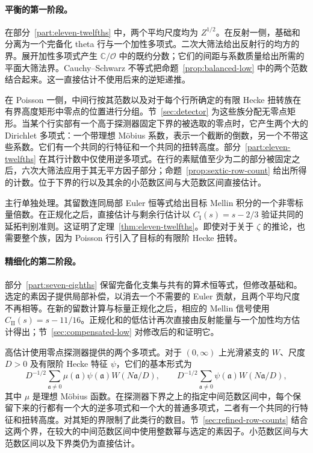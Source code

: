 \documentclass[11pt,a4paper]{article}
\numberwithin{equation}{section}
\numberwithin{figure}{section}
\theoremstyle{definition}
\theoremstyle{remark}
\begin{document}
\paragraph{平衡的第一阶段。}
在部分~\ref{part:eleven-twelfths} 中，两个平均尺度均为 $Z^{1/2}$。在反射一侧，基础和分离为一个完备化 theta 行与一个加性多项式。二次大筛法给出反射行的均方的界。展开加性多项式产生 $\mathbb C/\mathcal O$ 中的既约分数；它们的间距与系数质量给出所需的平面大筛法界。Cauchy--Schwarz 不等式把命题~\ref{prop:balanced-low} 中的两个范数结合起来。这一直接估计不使用后来的逆矩递推。

在 Poisson 一侧，中间行按其范数以及对于每个行所确定的有限 Hecke 扭转族在有界高度矩形中零点的位置进行分组。节~\ref{sec:detector} 为这些族分配无零点矩形。当某个行实部有一个高于探测器固定下界的被选取的零点时，它产生两个大的 Dirichlet 多项式：一个带理想 M\"obius 系数，表示一个截断的倒数，另一个不带这些系数。它们有一个共同的行特征和一个共同的扭转高度。部分~\ref{part:eleven-twelfths} 在其行计数中仅使用逆多项式。在行的素赋值至少为二的部分被固定之后，六次大筛法应用于其无平方因子部分；命题~\ref{prop:sextic-row-count} 给出所得的计数。位于下界的行以及其余的小范数区间与大范数区间直接估计。

主行单独处理。其留数连同局部 Euler 恒等式给出目标 Mellin 积分的一个非零标量倍数。在正规化之后，直接估计与剩余行估计以 $C_{\mathrm I}(s)=s-2/3$ 验证共同的延拓判别准则。这证明了定理~\ref{thm:eleven-twelfths}。即使对于关于 $\zeta$ 的推论，也需要整个族，因为 Poisson 行引入了目标的有限阶 Hecke 扭转。

\paragraph{精细化的第二阶段。}
部分~\ref{part:seven-eighths} 保留完备化支集与共有的算术恒等式，但修改基础和。选定的素因子提供局部补偿，以消去一个不需要的 Euler 贡献，且两个平均尺度不再相等。在新的留数计算与标量正规化之后，相应的 Mellin 信号使用 $C_{\mathrm{II}}(s)=s-11/16$。正规化和的低估计再次直接由反射能量与一个加性均方估计得出；节~\ref{sec:compensated-low} 对修改后的和证明它。

高估计使用零点探测器提供的两个多项式。对于 $(0,\infty)$ 上光滑紧支的 $W$、尺度 $D>0$ 及有限阶 Hecke 特征 $\psi$，它们的基本形式为
\[
 D^{-1/2}\sum_{\mathfrak a\ne0}\mu(\mathfrak a)\psi(\mathfrak a)
       W(N\mathfrak a/D),\qquad
 D^{-1/2}\sum_{\mathfrak a\ne0}\psi(\mathfrak a)W(N\mathfrak a/D),
\]
其中 $\mu$ 是理想 M\"obius 函数。在探测器下界之上的指定中间范数区间中，每个保留下来的行都有一个大的逆多项式和一个大的普通多项式，二者有一个共同的行特征和扭转高度。对其矩的界限制了此类行的数目。节~\ref{sec:refined-row-counts} 结合这两个界，在较大的中间范数区间中使用整数幂与选定的素因子。小范数区间与大范数区间以及下界类仍为直接估计。
\end{document}
